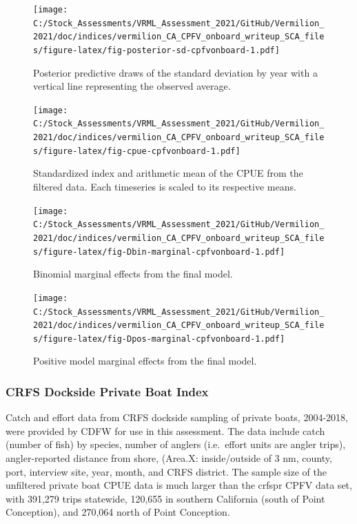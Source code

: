 \documentclass[
  english,
  a4paper,
]{article}
\begin{document}
\begin{figure}
\centering
\texttt{[image: C:/Stock\_Assessments/VRML\_Assessment\_2021/GitHub/Vermilion\_2021/doc/indices/vermilion\_CA\_CPFV\_onboard\_writeup\_SCA\_files/figure-latex/fig-posterior-sd-cpfvonboard-1.pdf]}
\caption{\label{fig:fig-posterior-sd-cpfvonboard}Posterior predictive draws of the standard deviation by year with a vertical line representing the observed average.}
\end{figure}

\begin{figure}
\centering
\texttt{[image: C:/Stock\_Assessments/VRML\_Assessment\_2021/GitHub/Vermilion\_2021/doc/indices/vermilion\_CA\_CPFV\_onboard\_writeup\_SCA\_files/figure-latex/fig-cpue-cpfvonboard-1.pdf]}
\caption{\label{fig:fig-cpue-cpfvonboard}Standardized index and arithmetic mean of the CPUE from the filtered data. Each timeseries is scaled to its respective means.}
\end{figure}

\begin{figure}
\centering
\texttt{[image: C:/Stock\_Assessments/VRML\_Assessment\_2021/GitHub/Vermilion\_2021/doc/indices/vermilion\_CA\_CPFV\_onboard\_writeup\_SCA\_files/figure-latex/fig-Dbin-marginal-cpfvonboard-1.pdf]}
\caption{\label{fig:fig-Dbin-marginal-cpfvonboard}Binomial marginal effects from the final model.}
\end{figure}

\begin{figure}
\centering
\texttt{[image: C:/Stock\_Assessments/VRML\_Assessment\_2021/GitHub/Vermilion\_2021/doc/indices/vermilion\_CA\_CPFV\_onboard\_writeup\_SCA\_files/figure-latex/fig-Dpos-marginal-cpfvonboard-1.pdf]}
\caption{\label{fig:fig-Dpos-marginal-cpfvonboard}Positive model marginal effects from the final model.}
\end{figure}

\clearpage

\hypertarget{crfs-dockside-private-boat-index}{%
\subsubsection{CRFS Dockside Private Boat Index}\label{crfs-dockside-private-boat-index}}

Catch and effort data from CRFS dockside sampling of private boats, 2004-2018,
were provided by CDFW for use in this assessment. The data include catch (number
of fish) by species, number of anglers (i.e.~effort units are angler trips),
angler-reported distance from shore, (Area.X: inside/outside of 3 nm, county, port,
interview site, year, month, and CRFS district. The sample size of the
unfiltered private boat CPUE data is much larger than the crfspr CPFV data set,
with 391,279 trips statewide, 120,655 in southern California (south
of Point Conception), and 270,064 north of Point Conception.
\end{document}
